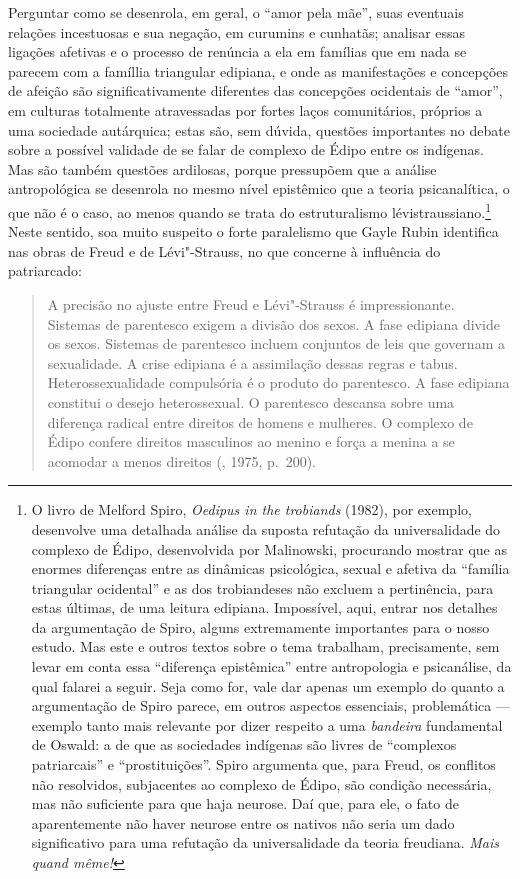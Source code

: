 Perguntar como se desenrola, em geral, o ``amor pela mãe'', suas
eventuais relações incestuosas e sua negação, em curumins e cunhatãs;
analisar essas ligações afetivas e o processo de renúncia a ela em
famílias que em nada se parecem com a famíllia triangular edipiana, e
onde as manifestações e concepções de afeição são significativamente
diferentes das concepções ocidentais de ``amor'', em culturas totalmente
atravessadas por fortes laços comunitários, próprios a uma sociedade
autárquica; estas são, sem dúvida, questões importantes no debate sobre
a possível validade de se falar de complexo de Édipo entre os indígenas.
Mas são também questões ardilosas, porque pressupõem que a análise
antropológica se desenrola no mesmo nível epistêmico que a teoria
psicanalítica, o que não é o caso, ao menos quando se trata do
estruturalismo lévistraussiano.\footnote{O livro de Melford Spiro,
  \emph{Oedipus in the trobiands} (1982), por exemplo, desenvolve uma
  detalhada análise da suposta refutação da universalidade do complexo
  de Édipo, desenvolvida por Malinowski, procurando mostrar que as
  enormes diferenças entre as dinâmicas psicológica, sexual e afetiva da
  ``família triangular ocidental'' e as dos trobiandeses não excluem a
  pertinência, para estas últimas, de uma leitura edipiana. Impossível,
  aqui, entrar nos detalhes da argumentação de Spiro, alguns
  extremamente importantes para o nosso estudo. Mas este e outros textos
  sobre o tema trabalham, precisamente, sem levar em conta essa
  ``diferença epistêmica'' entre antropologia e psicanálise, da qual
  falarei a seguir. Seja como for, vale dar apenas um exemplo do quanto
  a argumentação de Spiro parece, em outros aspectos essenciais,
  problemática --- exemplo tanto mais relevante por dizer respeito a uma
  \emph{bandeira} fundamental de Oswald: a de que as sociedades
  indígenas são livres de ``complexos patriarcais'' e ``prostituições''.
  Spiro argumenta que, para Freud, os conflitos não resolvidos,
  subjacentes ao complexo de Édipo, são condição necessária, mas não
  suficiente para que haja neurose. Daí que, para ele, o fato de
  aparentemente não haver neurose entre os nativos não seria um dado
  significativo para uma refutação da universalidade da teoria
  freudiana. \emph{Mais quand même!}} Neste sentido, soa muito suspeito
o forte paralelismo que Gayle Rubin identifica nas obras de Freud e de
Lévi"-Strauss, no que concerne à influência do patriarcado:

\begin{quote}
A precisão no ajuste entre Freud e Lévi"-Strauss é impressionante.
Sistemas de parentesco exigem a divisão dos sexos. A fase edipiana
divide os sexos. Sistemas de parentesco incluem conjuntos de leis que
governam a sexualidade. A crise edipiana é a assimilação dessas regras e
tabus. Heterossexualidade compulsória é o produto do parentesco. A fase
edipiana constitui o desejo heterossexual. O parentesco descansa sobre
uma diferença radical entre direitos de homens e mulheres. O complexo de
Édipo confere direitos masculinos ao menino e força a menina a se
acomodar a menos direitos (, 1975, p.~200).
\end{quote}

